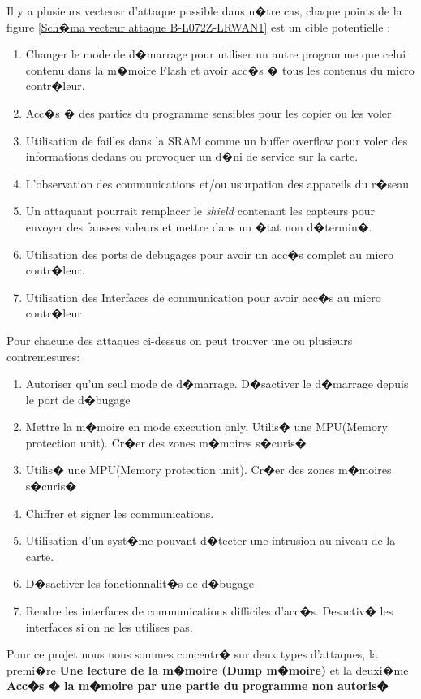 \documentclass[a4paper, titlepage,12pt]{report}
\begin{document}
Il y a plusieurs vecteusr d'attaque possible dans n�tre cas, chaque points de la figure \ref{Sch�ma vecteur attaque B-L072Z-LRWAN1} est un cible potentielle :

\begin{enumerate}
\item Changer le mode de d�marrage pour utiliser un autre programme que celui contenu dans la m�moire Flash et avoir acc�s � tous les contenus du micro contr�leur.
\item Acc�s � des parties du programme sensibles pour les copier ou les voler
\item Utilisation de failles dans la SRAM comme un buffer overflow pour voler des informations dedans ou provoquer un d�ni de service sur la carte.
\item L'observation des communications et/ou usurpation des appareils du r�seau
\item Un attaquant pourrait remplacer le \textit{shield} contenant les capteurs pour envoyer des fausses valeurs et mettre dans un �tat non d�termin�.
\item Utilisation des ports de debugages pour avoir un acc�s complet au micro contr�leur.
\item Utilisation des Interfaces de communication pour avoir acc�s au micro contr�leur
\end{enumerate}

Pour chacune des attaques ci-dessus on peut trouver une ou plusieurs contremesures:
\begin{enumerate}
\item Autoriser qu'un seul mode de d�marrage. D�sactiver le d�marrage depuis le port de d�bugage
\item Mettre la m�moire en mode execution only. Utilis� une MPU(Memory protection unit). Cr�er des zones m�moires s�curis�
\item Utilis� une MPU(Memory protection unit). Cr�er des zones m�moires s�curis�
\item Chiffrer et signer les communications.
\item Utilisation d'un syst�me pouvant d�tecter une intrusion au niveau de la carte.
\item D�sactiver les fonctionnalit�s de d�bugage
\item Rendre les interfaces de communications difficiles d'acc�s. Desactiv� les interfaces si on ne les utilises pas.
\end{enumerate}

Pour ce projet nous nous sommes concentr� sur deux types d'attaques, la premi�re \textbf{Une lecture de la m�moire (Dump m�moire)} et la deuxi�me \textbf{Acc�s � la m�moire par une partie du programme non autoris�}
\end{document}
